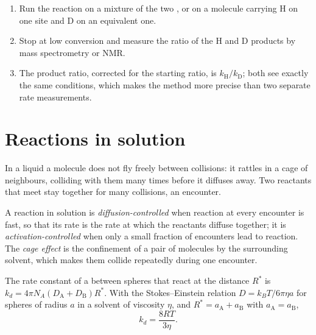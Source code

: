 \begin{method}\label{met:b3:rate-theories:kie}
\begin{enumerate}
  \item Run the reaction on a mixture of the two , or on a
        molecule carrying H on one site and D on an equivalent one.
  \item Stop at low conversion and measure the ratio of the H and D products by
        mass spectrometry or NMR.
  \item The product ratio, corrected for the starting ratio, is $k_{\mathrm H}/k_{\mathrm D}$; both
         see exactly the same conditions, which makes the method
        more precise than two separate rate measurements.
\end{enumerate}
\end{method}

\section{Reactions in solution}

In a liquid a molecule does not fly freely between collisions: it rattles in a
cage of neighbours, colliding with them many times before it diffuses away.
Two reactants that meet stay together for many collisions, an encounter.

\begin{definition}\label{def:b3:rate-theories:diffusion}
A reaction in solution is \emph{diffusion-controlled}
when reaction at every encounter is fast, so that its rate is the rate
at which the reactants diffuse together; it is
\emph{activation-controlled} when only a small
fraction of encounters lead to reaction. The \emph{cage effect}
is the confinement of a pair of molecules by the surrounding solvent,
which makes them collide repeatedly during one encounter.
\end{definition}

\begin{proposition}\label{prop:b3:rate-theories:smoluchowski}
The rate constant of a  between spheres that react
at the distance $R^*$ is $k_d = 4\pi N_A(D_{\mathrm A} + D_{\mathrm B})R^*$. With the Stokes--Einstein
relation $D = k_BT/6\pi\eta a$ for spheres of radius $a$ in a solvent of viscosity $\eta$,
and $R^* = a_{\mathrm A} + a_{\mathrm B}$ with $a_{\mathrm A} = a_{\mathrm B}$,
\[
  k_d = \frac{8RT}{3\eta} .
\]
\end{proposition}

